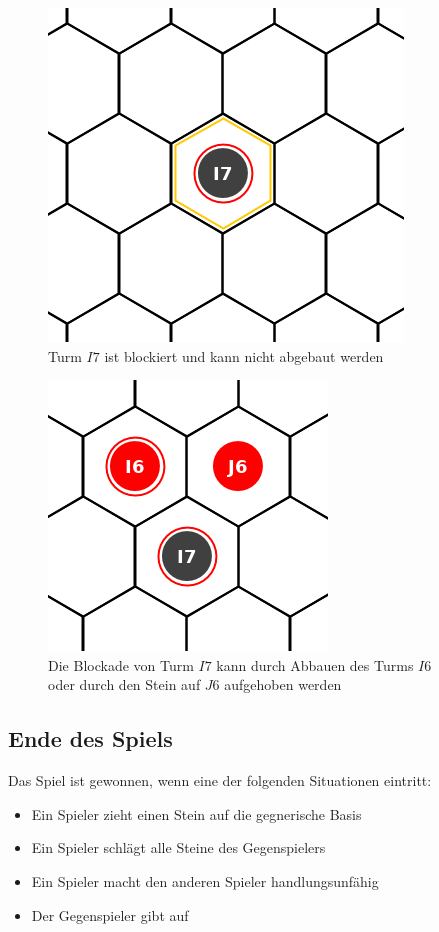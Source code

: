 \begin{figure}[ht]
\begin{center}
\includegraphics[scale=0.25]{graphic/tower-blocked.png} \\
\smallskip
{\footnotesize Turm $I7$ ist blockiert und kann nicht abgebaut werden}
\end{center}
\end{figure}

\begin{figure}[ht]
\begin{center}
\includegraphics[scale=0.25]{graphic/tower-unblock.png} \\
\smallskip
{\footnotesize Die Blockade von Turm $I7$ kann durch Abbauen des Turms $I6$\\ oder durch den Stein auf $J6$ aufgehoben werden}
\end{center}
\end{figure}

\subsection*{Ende des Spiels}
Das Spiel ist gewonnen, wenn eine der folgenden Situationen eintritt:
\begin{itemize}
\item Ein Spieler zieht einen Stein auf die gegnerische Basis
\item Ein Spieler schlägt alle Steine des Gegenspielers
\item Ein Spieler macht den anderen Spieler handlungsunfähig
\item Der Gegenspieler gibt auf
\end{itemize}

